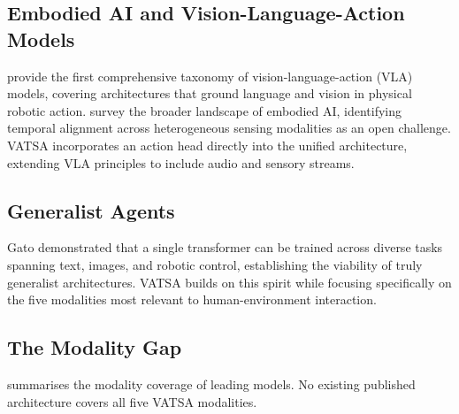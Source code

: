 \documentclass[11pt,a4paper]{article}
\begin{document}
\subsection{Embodied AI and Vision-Language-Action Models}

\citet{ma2024vla} provide the first comprehensive taxonomy of vision-language-action
(VLA) models, covering architectures that ground language and vision in physical
robotic action.  \citet{liu2025embodied} survey the broader landscape of embodied AI,
identifying temporal alignment across heterogeneous sensing modalities as an open
challenge.  VATSA incorporates an action head directly into the unified architecture,
extending VLA principles to include audio and sensory streams.

\subsection{Generalist Agents}

Gato \citep{reed2022gato} demonstrated that a single transformer can be trained across
diverse tasks spanning text, images, and robotic control, establishing the viability of
truly generalist architectures.  VATSA builds on this spirit while focusing specifically
on the five modalities most relevant to human-environment interaction.

\subsection{The Modality Gap}

 summarises the modality coverage of leading models.  No existing
published architecture covers all five VATSA modalities.
\end{document}
